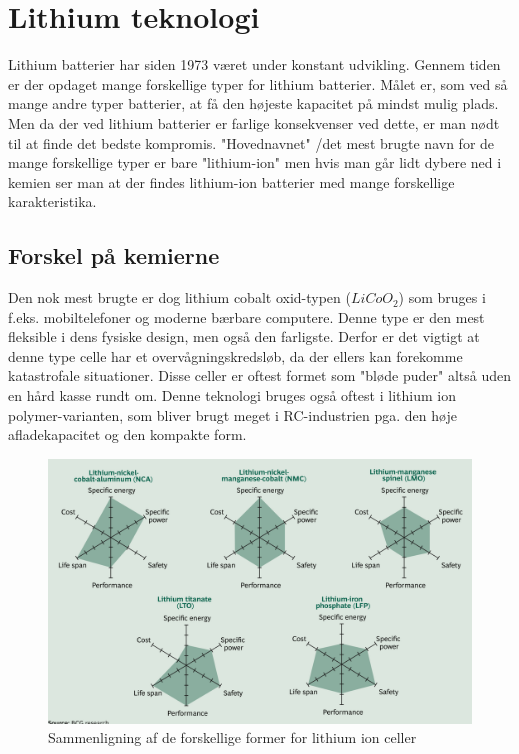 \section{Lithium teknologi}
Lithium batterier har siden 1973 været under konstant udvikling. Gennem tiden er der opdaget mange forskellige typer for lithium batterier. Målet er, som ved så mange andre typer batterier, at få den højeste kapacitet på mindst mulig plads. Men da der ved lithium batterier er farlige konsekvenser ved dette, er man nødt til at finde det bedste kompromis. "Hovednavnet" \space /det mest brugte navn for de mange forskellige typer er bare "lithium-ion" \space men hvis man går lidt dybere ned i kemien ser man at der findes lithium-ion batterier med mange forskellige karakteristika. 

\subsection{Forskel på kemierne}
Den nok mest brugte er dog lithium cobalt oxid-typen ($LiCoO_2$) som bruges i f.eks. mobiltelefoner og moderne bærbare computere. Denne type er den mest fleksible i dens fysiske design, men også den farligste. Derfor er det vigtigt at denne type celle har et overvågningskredsløb, da der ellers kan forekomme katastrofale situationer. Disse celler er oftest formet som "bløde puder" \space \textemdash \space altså uden en hård kasse rundt om. Denne teknologi bruges også oftest i lithium ion polymer-varianten, som bliver brugt meget i RC-industrien pga. den høje afladekapacitet og den kompakte form.

\begin{figure}[h]
	\centering
	\includegraphics[width=12cm]{billeder/lithium-variants-comparison.png}
	\caption{Sammenligning af de forskellige former for lithium ion celler\protect\footnotemark}
	\label{fig:lithium_variants_comparison}
\end{figure}

